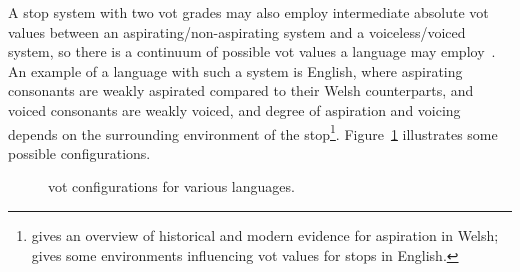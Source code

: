 A stop system with two \gls{vot} grades may also employ intermediate absolute \gls{vot} values between an aspirating/non-aspirating system and a voiceless/voiced system, so there is a continuum of possible \gls{vot} values a language may employ~\autocite[226]{CL_Variationuniversals99}. An example of a language with such a system is English, where aspirating consonants are weakly aspirated compared to their Welsh counterparts, and voiced consonants are weakly voiced, and degree of aspiration and voicing depends on the surrounding environment of the stop\footnote{\Textcite{Esk_LaryngealRealism18} gives an overview of historical and modern evidence for aspiration in Welsh; \textcite[26--28]{Roa_Englishphonetics08} gives some environments influencing \gls{vot} values for stops in English.}. Figure~\ref{fig:votvarlang} illustrates some possible configurations. 

\begin{figure}[h]
  \centering
  \caption{\Acrshort{vot} configurations for various languages.}
  \label{fig:votvarlang}
\end{figure}


